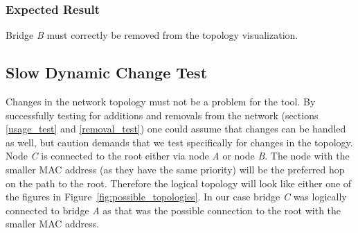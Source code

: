 \subsubsection*{Expected Result}
Bridge \textit{B} must correctly be removed from the topology visualization.

\subsection*{Slow Dynamic Change Test}
\label{slow_dynamic_test}
Changes in the network topology must not be a problem for the tool.
By successfully testing for additions and removals from the network (sections \ref{usage_test} and \ref{removal_test}) one could assume that changes can be handled as well, but caution demands that we test specifically for changes in the topology.
Node \textit{C} is connected to the root either via node \textit{A} or node \textit{B}.
The node with the smaller MAC address (as they have the same priority) will be the preferred hop on the path to the root.
Therefore the logical topology will look like either one of the figures in Figure~\ref{fig:possible_topologies}.
In our case bridge \textit{C} was logically connected to bridge \textit{A} as that was the possible connection to the root with the smaller MAC address.

